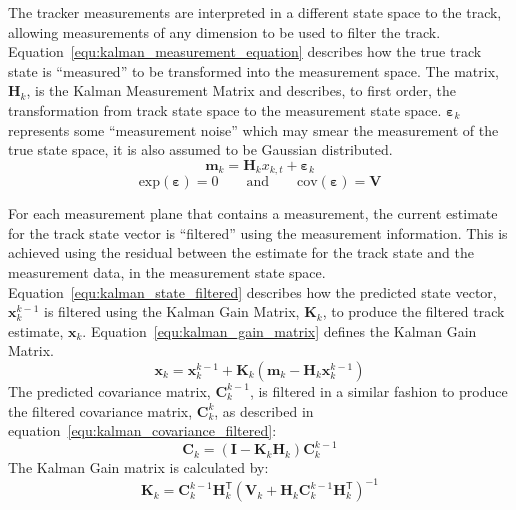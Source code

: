      The tracker measurements are interpreted in a different state space to the track, allowing measurements of any dimension to be used to filter the track. Equation~\ref{equ:kalman_measurement_equation} describes how the true track state is ``measured'' to be transformed into the measurement space. The matrix, $\mathbf{H}_k$, is the Kalman Measurement Matrix and describes, to first order, the transformation from track state space to the measurement state space. $\mathbf{\varepsilon}_k$ represents some ``measurement noise'' which may smear the measurement of the true state space, it is also assumed to be Gaussian distributed.
    \begin{equation}
      \mathbf{m}_k = \mathbf{H}_kx_{k,t} + \mathbf{\varepsilon}_k
      \label{equ:kalman_measurement_equation}
    \end{equation}
    \begin{equation*}
      \textrm{exp}(\mathbf{\varepsilon}) = 0 \quad\quad \textrm{and} \quad\quad \textrm{cov}(\mathbf{\varepsilon}) = \mathbf{V}
    \end{equation*}

    For each measurement plane that contains a measurement, the current estimate for the track state vector is ``filtered'' using the measurement information. This is achieved using the residual between the estimate for the track state and the measurement data, in the measurement state space. Equation~\ref{equ:kalman_state_filtered} describes how the predicted state vector, $\mathbf{x}_{k}^{k-1}$ is filtered using the Kalman Gain Matrix, $\mathbf{K}_k$, to produce the filtered track estimate, $\mathbf{x}_k$. Equation~\ref{equ:kalman_gain_matrix} defines the Kalman Gain Matrix.
    \begin{equation}
      \mathbf{x}_k = \mathbf{x}_k^{k-1} + \mathbf{K}_k ( \mathbf{m}_k - \mathbf{H}_k \mathbf{x}_k^{k-1} )
      \label{equ:kalman_state_filtered}
    \end{equation}
    The predicted covariance matrix, $\mathbf{C}_k^{k-1}$, is filtered in a similar  fashion to produce the filtered covariance matrix, $\mathbf{C}_k^{k}$, as described in equation~\ref{equ:kalman_covariance_filtered}:
    \begin{equation}
      \mathbf{C}_k = ( \mathbf{I} - \mathbf{K}_k \mathbf{H}_k ) \mathbf{C}_k^{k-1}
      \label{equ:kalman_covariance_filtered}
    \end{equation}
    The Kalman Gain matrix is calculated by:
    \begin{equation}
      \mathbf{K}_k = \mathbf{C}_k^{k-1} \mathbf{H}_k^\mathsf{T} (\mathbf{V}_k + \mathbf{H}_k \mathbf{C}_k^{k-1} \mathbf{H}_k^\mathsf{T})^{-1}
      \label{equ:kalman_gain_matrix}
    \end{equation}


